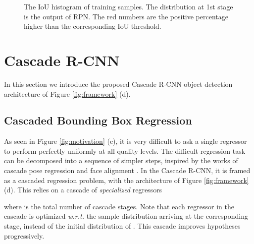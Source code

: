 \documentclass[10pt,twocolumn,letterpaper]{article}
\begin{document}
\begin{figure}[!t]
\begin{minipage}[b]{.3\linewidth}
\centering
\centerline{}
\end{minipage}
\hfill
\begin{minipage}[b]{.3\linewidth}
\centering
\centerline{}
\end{minipage}
\hfill
\begin{minipage}[b]{.3\linewidth}
\centering
\centerline{}
\end{minipage}
\caption{The IoU histogram of training samples. The distribution at 1st stage is the output of RPN. The red numbers are the positive percentage higher than the corresponding IoU threshold.}
\label{fig:hist}
\end{figure}

\section{Cascade R-CNN}

In this section we introduce the proposed Cascade R-CNN object detection architecture of Figure \ref{fig:framework} (d).

\subsection{Cascaded Bounding Box Regression}
\label{subsec:cascade bbox}

As seen in Figure \ref{fig:motivation} (c), it is very difficult to ask
a single regressor to perform perfectly uniformly at all quality levels.
The difficult regression task can be decomposed into a sequence of simpler
steps, inspired by the works of cascade pose
regression \cite{DBLP:conf/cvpr/DollarWP10} and face
alignment \cite{DBLP:conf/cvpr/CaoWWS12,yan2013learn}. In the
Cascade R-CNN, it is framed as a cascaded regression problem, with the
architecture of Figure \ref{fig:framework} (d). This relies on a cascade
of {\it specialized\/} regressors

where  is the total number of cascade stages. Note that each regressor
 in the cascade is optimized \textit{w.r.t.} the sample
distribution  arriving at the corresponding stage,
instead of the initial distribution of . This cascade
improves hypotheses progressively.
\end{document}
